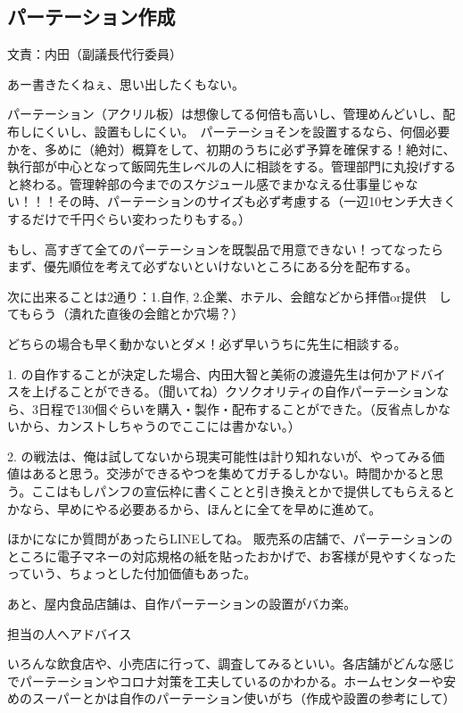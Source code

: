 \documentclass[dvipdfmx,jb5]{jarticle}
\begin{document}
\subsection{パーテーション作成} 文責：内田（副議長代行委員） \vspace{2mm}

あー書きたくねぇ、思い出したくもない。

パーテーション（アクリル板）は想像してる何倍も高いし、管理めんどいし、配布しにくいし、設置もしにくい。　パーテーショそンを設置するなら、何個必要かを、多めに（絶対）概算をして、初期のうちに必ず予算を確保する！絶対に、執行部が中心となって飯岡先生レベルの人に相談をする。管理部門に丸投げすると終わる。管理幹部の今までのスケジュール感でまかなえる仕事量じゃない！！！その時、パーテーションのサイズも必ず考慮する（一辺10センチ大きくするだけで千円ぐらい変わったりもする。）

もし、高すぎて全てのパーテーションを既製品で用意できない！ってなったら
まず、優先順位を考えて必ずないといけないところにある分を配布する。

次に出来ることは2通り：1.自作, 2.企業、ホテル、会館などから拝借or提供　してもらう（潰れた直後の会館とか穴場？）

どちらの場合も早く動かないとダメ！必ず早いうちに先生に相談する。

1. の自作することが決定した場合、内田大智と美術の渡邉先生は何かアドバイスを上げることができる。（聞いてね）クソクオリティの自作パーテーションなら、3日程で130個ぐらいを購入・製作・配布することができた。（反省点しかないから、カンストしちゃうのでここには書かない。）

2. の戦法は、俺は試してないから現実可能性は計り知れないが、やってみる価値はあると思う。交渉ができるやつを集めてガチるしかない。時間かかると思う。ここはもしパンフの宣伝枠に書くことと引き換えとかで提供してもらえるとかなら、早めにやる必要あるから、ほんとに全てを早めに進めて。

ほかになにか質問があったらLINEしてね。
販売系の店舗で、パーテーションのところに電子マネーの対応規格の紙を貼ったおかげで、お客様が見やすくなったっていう、ちょっとした付加価値もあった。

あと、屋内食品店舗は、自作パーテーションの設置がバカ楽。

担当の人へアドバイス

いろんな飲食店や、小売店に行って、調査してみるといい。各店舗がどんな感じでパーテーションやコロナ対策を工夫しているのかわかる。ホームセンターや安めのスーパーとかは自作のパーテーション使いがち（作成や設置の参考にして）
\end{document}
